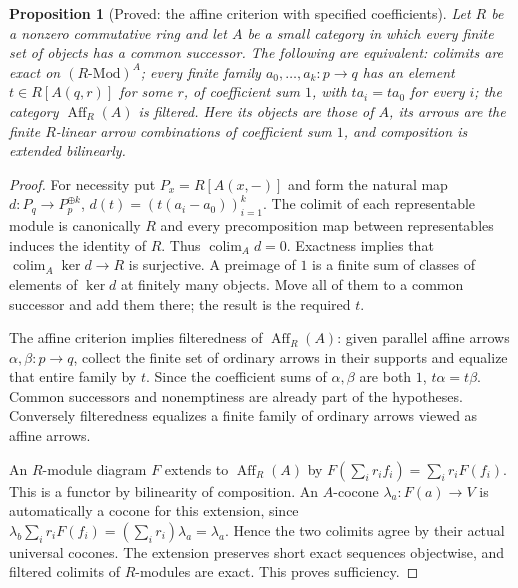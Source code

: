 \documentclass[11pt,a4paper]{article}
\newtheorem{proposition}[theorem]{Proposition}
\theoremstyle{definition}
\begin{document}
\begin{proposition}[Proved: the affine criterion with specified coefficients]\label{main:ring-affine}
Let $R$ be a nonzero commutative ring and let $A$ be a small category in
which every finite set of objects has a common successor. The following
are equivalent: colimits are exact on $(R\text{-}\mathrm{Mod})^A$;
every finite family $a_0,\ldots,a_k:p\to q$ has an element
$t\in R[A(q,r)]$ for some $r$, of coefficient sum $1$, with
$ta_i=ta_0$ for every $i$; the category $\operatorname{Aff}_R(A)$ is
filtered. Here its objects are those of $A$, its arrows are the finite
$R$-linear arrow combinations of coefficient sum $1$, and composition
is extended bilinearly.
\end{proposition}
\begin{proof}
For necessity put $P_x=R[A(x,-)]$ and form the natural map
$d:P_q\to P_p^{\oplus k}$, $d(t)=(t(a_i-a_0))_{i=1}^k$.
The colimit of each representable module is canonically $R$ and every
precomposition map between representables induces the identity of $R$.
Thus $\operatorname{colim}_A d=0$. Exactness implies that
$\operatorname{colim}_A\ker d\to R$ is surjective. A preimage of $1$
is a finite sum of classes of elements of $\ker d$ at finitely many
objects. Move all of them to a common successor and add them there;
the result is the required $t$.

The affine criterion implies filteredness of $\operatorname{Aff}_R(A)$:
given parallel affine arrows $\alpha,\beta:p\to q$, collect the finite
set of ordinary arrows in their supports and equalize that entire
family by $t$. Since the coefficient sums of $\alpha,\beta$ are both
$1$, $t\alpha=t\beta$. Common successors and nonemptiness are already
part of the hypotheses. Conversely filteredness equalizes a finite
family of ordinary arrows viewed as affine arrows.

An $R$-module diagram $F$ extends to $\operatorname{Aff}_R(A)$ by
$F(\sum_i r_i f_i)=\sum_i r_iF(f_i)$. This is a functor by
bilinearity of composition. An $A$-cocone $\lambda_a:F(a)\to V$
is automatically a cocone for this extension, since
$\lambda_b\sum_i r_iF(f_i)=(\sum_i r_i)\lambda_a=\lambda_a$.
Hence the two colimits agree by their actual universal cocones.
The extension preserves short exact sequences objectwise, and
filtered colimits of $R$-modules are exact. This proves sufficiency.
\end{proof}
\end{document}
